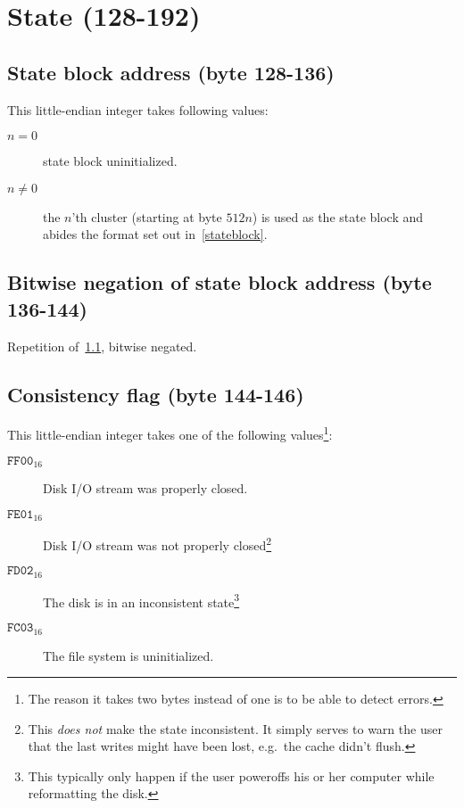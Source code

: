 \documentclass[11pt,a4paper]{report}
\newcommand{\clustersize}{512 }
\begin{document}
        \section{State (128-192)}
        \subsection{State block address (byte 128-136)}
        \label{header:stateblock}
        This little-endian integer takes following values:

        \begin{description}
            \item [$n = 0$]    state block uninitialized.
            \item [$n \neq 0$] the $n$'th cluster
                (starting at byte $\clustersize n$) is used
                as the state block and abides the format set out
                in~\ref{stateblock}.
        \end{description}

        \subsection{Bitwise negation of state block address (byte 136-144)}
        Repetition of~\ref{header:stateblock}, bitwise negated.

        \subsection{Consistency flag (byte 144-146)}
        \label{header:consistency}
        This little-endian integer takes one of the following
        values\footnote{The reason it takes two bytes instead of one is to be
        able to detect errors.}:

        \begin{description}
            \item [$\texttt{FF00}_{16}$] Disk I/O stream was properly closed.
            \item [$\texttt{FE01}_{16}$] Disk I/O stream was not properly
                closed\footnote{This \emph{does not} make the state
                inconsistent. It simply serves to warn the user that the last
                writes might have been lost, e.g.\ the cache didn't flush.}
            \item [$\texttt{FD02}_{16}$] The disk is in an inconsistent
                state\footnote{This typically only happen if the user poweroffs
                his or her computer while reformatting the disk.}
            \item [$\texttt{FC03}_{16}$] The file system is uninitialized.
        \end{description}
\end{document}
